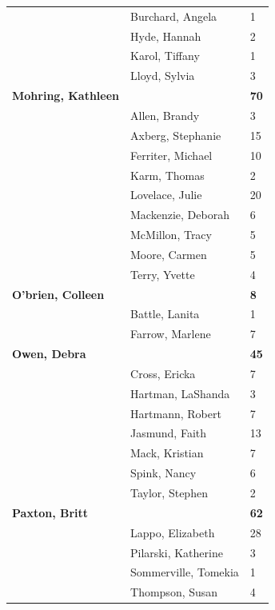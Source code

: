 \documentclass{article}\usepackage[]{graphicx}\usepackage[]{color}
\begin{document}
{\begin{longtable} { >{\raggedright}p{}|p{}p{}}
   & Burchard, Angela & 1 \\ 
   & Hyde, Hannah & 2 \\ 
   & Karol, Tiffany & 1 \\ 
   \rowcolor[gray]{0.90} & Lloyd, Sylvia & 3 \\ 
   \rowcolor[gray]{0.90}\textbf{Mohring, Kathleen} &  & \hspace{2cm}\textbf{70} \\ 
   \rowcolor[gray]{0.90} & Allen, Brandy & 3 \\ 
   & Axberg, Stephanie & 15 \\ 
   & Ferriter, Michael & 10 \\ 
   & Karm, Thomas & 2 \\ 
   \rowcolor[gray]{0.90} & Lovelace, Julie & 20 \\ 
   \rowcolor[gray]{0.90} & Mackenzie, Deborah & 6 \\ 
   \rowcolor[gray]{0.90} & McMillon, Tracy & 5 \\ 
   & Moore, Carmen & 5 \\ 
   & Terry, Yvette & 4 \\ 
  \textbf{O'brien, Colleen} &  & \hspace{2cm}\textbf{8} \\ 
   \rowcolor[gray]{0.90} & Battle, Lanita & 1 \\ 
   \rowcolor[gray]{0.90} & Farrow, Marlene & 7 \\ 
   \rowcolor[gray]{0.90}\textbf{Owen, Debra} &  & \hspace{2cm}\textbf{45} \\ 
   & Cross, Ericka & 7 \\ 
   & Hartman, LaShanda & 3 \\ 
   & Hartmann, Robert & 7 \\ 
   \rowcolor[gray]{0.90} & Jasmund, Faith & 13 \\ 
   \rowcolor[gray]{0.90} & Mack, Kristian & 7 \\ 
   \rowcolor[gray]{0.90} & Spink, Nancy & 6 \\ 
   & Taylor, Stephen & 2 \\ 
  \textbf{Paxton, Britt} &  & \hspace{2cm}\textbf{62} \\ 
   & Lappo, Elizabeth & 28 \\ 
   \rowcolor[gray]{0.90} & Pilarski, Katherine & 3 \\ 
   \rowcolor[gray]{0.90} & Sommerville, Tomekia & 1 \\ 
   \rowcolor[gray]{0.90} & Thompson, Susan & 4 \\ 

\end{longtable}}
\end{document}

